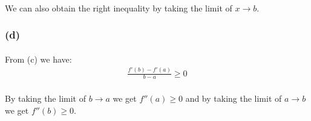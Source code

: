 \paragraph{}
We can also obtain the right inequality by taking the limit of $x \rightarrow b$.
\subsubsection*{(d)}
\paragraph{}
From (c) we have:
\begin{align*}
\frac{f'(b)-f'(a)}{b-a} \geq 0
\end{align*}
\paragraph{}
By taking the limit of $b \rightarrow a$ we get $f''(a) \geq 0$ and by taking the limit of $a \rightarrow b$ we get $f''(b) \geq 0$.